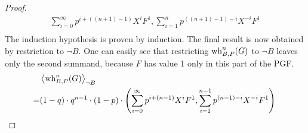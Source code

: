 \begin{lemma}
\begin{proof}
\begin{align*}
{				\sum_{i=0}^{\infty} p^{i+((n+1)-1)} X^i F^1,
				\sum_{i=1}^{n} p^{((n+1)-1)-i} X^{-i} F^1 } \\
		\end{align*}
		The induction hypothesis is proven by induction.
		The final result is now obtained by restriction to $\lnot B$.
		One can easily see that restricting $\operatorname{wh}_{B, P}^n(G)$ to $\lnot B$ leaves only the second summand, because $F$ has value 1 only in this part of the PGF.
		\begin{align*}
			 & \left\langle \operatorname{wh}_{B, P}^n(G) \right\rangle_{\lnot B} \\
			=& (1-q) \cdot q^{n-1} \cdot (1-p) \cdot \left( 
				\sum_{i=0}^{\infty} p^{i+(n-1)} X^i F^1,
				\sum_{i=1}^{n-1} p^{(n-1)-i} X^{-i} F^1 \right)			\qedhere
		\end{align*}
	\end{proof}
\end{lemma}

